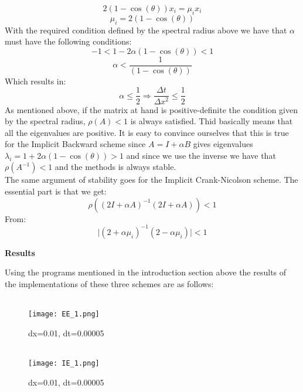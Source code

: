 \documentclass[a4paper,11pt]{article}
\newcommand{\vsp}{\vspace{0.2cm}}
\newcommand{\secti}[1]{\begin{center} \Large\bf{{#1}} \end{center}}
\begin{document}
    \begin{equation*}
        2(1-\cos{(\theta)})x_i = \mu_i x_i
    \end{equation*}
    \begin{equation*}
        \mu_i = 2(1-\cos{(\theta)})
    \end{equation*}
    With the required condition defined by the spectral radius above we have that $\alpha$ must have the following conditions:
    \begin{equation*}
        -1 < 1-2\alpha (1-\cos{(\theta)}) < 1
    \end{equation*}
    \begin{equation*}
        \alpha < \frac{1}{(1-\cos{(\theta)})}
    \end{equation*}
    Which results in:
    \begin{equation*}
        \alpha \leq \frac{1}{2} \Rightarrow \frac{\Delta t}{\Delta x^2} \leq \frac{1}{2}
    \end{equation*}
    As mentioned above, if the matrix at hand is positive-definite the condition given by the spectral radius, $\rho(A)<1$ is always satisfied. Thid basically means that all the eigenvalues are positive. It is easy to convince ourselves that this is true for the Implicit Backward scheme since $A=I+\alpha B$ gives eigenvalues $\lambda_i = 1+2\alpha (1-\cos{(\theta)})>1$ and since we use the inverse we have that $\rho(A^{-1}) < 1$ and the methods is always stable.\vsp\\
    The same argument of stability goes for the Implicit Crank-Nicolson scheme. The essential part is that we get:
    \begin{equation*}
        \rho((2I+\alpha A)^{-1}(2I+\alpha A)) < 1
    \end{equation*}
    From:
    \begin{equation*}
        \bigg|(2+\alpha\mu_i)^{-1}(2-\alpha\mu_i)\bigg| < 1
    \end{equation*}
\newpage
\secti{Results}
    Using the programs mentioned in the introduction section above the results of the implementations of these three schemes are as follows:\vsp\\
    \begin{figure}[H]
        \centering
        \\
        \texttt{[image: EE\_1.png]}
        \caption*{dx=0.01, dt=0.00005}
    \end{figure}
    \begin{figure}[H]
        \centering
        \\
        \texttt{[image: IE\_1.png]}
        \caption*{dx=0.01, dt=0.00005}
    \end{figure}
\end{document}
